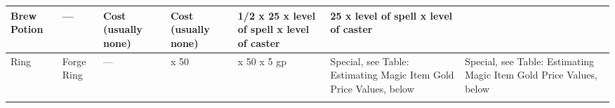 \begin{longtable}{llllllllllllll}
{\begin{minipage}[t]{0.039in}
Brew Potion\end{minipage}} & \multicolumn{1}{p{0.039in}|}{\begin{minipage}[t]{0.039in}\raggedright
 --- \end{minipage}} & \multicolumn{1}{p{0.039in}|}{\begin{minipage}[t]{0.039in}\raggedright
Cost (usually none) \end{minipage}} & \multicolumn{1}{p{0.039in}|}{\begin{minipage}[t]{0.039in}\raggedright
Cost (usually none) \end{minipage}} & \multicolumn{1}{p{0.039in}|}{\begin{minipage}[t]{0.039in}\raggedright
1/2 x 25 x level of spell x level of caster\end{minipage}} & \multicolumn{1}{p{0.039in}|}{\begin{minipage}[t]{0.039in}\raggedright
25 x level of spell x level of caster\end{minipage}}\\
\hline
\multicolumn{1}{|p{0.472in}|}{\begin{minipage}[t]{0.472in}\centering
Ring \end{minipage}} & \multicolumn{1}{p{0.639in}|}{\begin{minipage}[t]{0.639in}\raggedright
Forge Ring \end{minipage}} & \multicolumn{1}{p{0.497in}|}{\begin{minipage}[t]{0.497in}\raggedright
---\end{minipage}} & \multicolumn{1}{p{0.564in}|}{\begin{minipage}[t]{0.564in}\raggedright
 x 50 \end{minipage}} & \multicolumn{1}{p{0.544in}|}{\begin{minipage}[t]{0.544in}\raggedright
x 50 \linebreak
x 5 gp\end{minipage}} & \multicolumn{1}{p{0.739in}|}{\begin{minipage}[t]{0.739in}\raggedright
Special, see Table: Estimating Magic Item Gold Price Values, below\end{minipage}} & \multicolumn{8}{p{1.044in}|}{\begin{minipage}[t]{1.044in}\raggedright
Special, see Table: Estimating Magic Item Gold Price Values, below\end{minipage}}\\
\hline
\multicolumn{1}{|p{0.472in}|}{\begin{minipage}[t]{0.472in}\centering

\end{minipage}}
\end{longtable}
